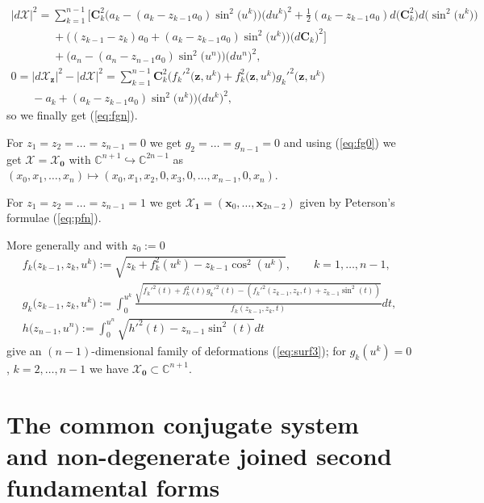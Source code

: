 \begin{gather*}
|d\mathcal{X}|^2=\sum_{k=1}^{n-1}\big[\mathbf{C}_k^2\big(a_k-
(a_k-z_{k-1}a_0)\sin^2\big(u^k\big)\big)\big(du^k\big)^2
+\tfrac{1}{2}(a_k-z_{k-1}a_0)d\big(\mathbf{C}_k^2\big)d\big(\sin^2\big(u^k\big)\big)
\\
\phantom{|d\mathcal{X}|^2=}{}
+\big((z_{k-1}-z_k)a_0+
(a_k-z_{k-1}a_0)\sin^2\big(u^k\big)\big)\big(d\mathbf{C}_k\big)^2\big]\\
\phantom{|d\mathcal{X}|^2=}{}
+\big(a_n-(a_n-z_{n-1}a_0)\sin^2\big(u^n\big)\big)\big(du^n\big)^2,
\\
0=|d\mathcal{X}_{\mathbf{z}}|^2-|d\mathcal{X}|^2=
\sum_{k=1}^{n-1}\mathbf{C}_k^2\big(f_k'^2\big(\mathbf{z},u^k\big)
+f_k^2\big(\mathbf{z},u^k\big)g_k'^2\big(\mathbf{z},u^k\big)\\
\phantom{0=}{}-a_k+
(a_k-z_{k-1}a_0)\sin^2\big(u^k\big)\big)\big(du^k\big)^2,
\end{gather*}
so we f\/inally get (\ref{eq:fgn}).

For $z_1=z_2=\dots =z_{n-1}=0$ we get $g_2=\dots =g_{n-1}=0$ and using
(\ref{eq:fg0}) we get $\mathcal{X}=\mathcal{X}_{\mathbf{0}}$ with
$\mathbb{C}^{n+1}\hookrightarrow\mathbb{C}^{2n-1}$ as
$(x_0,x_1,\dots ,x_n)\mapsto(x_0,x_1,x_2,0,x_3,0,\dots ,x_{n-1},0,x_n)$.

For $z_1=z_2=\dots =z_{n-1}=1$ we get
$\mathcal{X}_{\mathbf{1}}=(\mathbf{x}_0,\dots ,\mathbf{x}_{2n-2})$
given by Peterson's formulae (\ref{eq:pfn}).

More generally and with $z_0:=0$
\begin{gather}
f_k\big(z_{k-1},z_k,u^k\big):=\sqrt{z_k+f_k^2(u^k)-z_{k-1}\cos^2(u^k)},\qquad k=1,\dots ,n-1,\nonumber\\
g_k\big(z_{k-1},z_k,u^k\big):=\int_0^{u^k}\frac{\sqrt{f_k'^2(t)+f_k^2(t)g_k'^2(t)-
(f_k'^2(z_{k-1},z_k,t)+z_{k-1}\sin^2(t))}}
{f_k(z_{k-1},z_k,t)}dt,\nonumber\\
h\big(z_{n-1},u^n\big):=\int_0^{u^n}\sqrt{h'^2(t)-z_{n-1}\sin^2(t)}dt \label{eq:fgr}
\end{gather}
give an $(n-1)$-dimensional family of deformations
(\ref{eq:surf3}); for $g_k(u^k)=0$, $k=2,\dots ,n-1$ we have
$\mathcal{X}_{\mathbf{0}}\subset\mathbb{C}^{n+1}$.

\section{The common conjugate system\\ and non-degenerate joined second fundamental forms}\label{sec:pet2}


